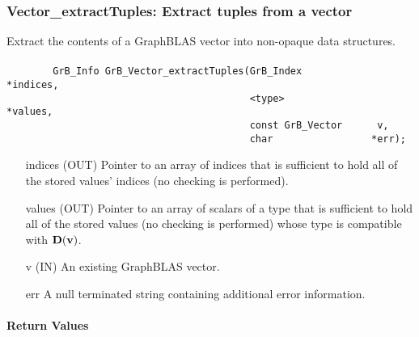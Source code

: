 
\subsubsection{{\sf Vector\_extractTuples}: Extract tuples from a vector}
\label{Sec:Vector_extractTuples}

Extract the contents of a GraphBLAS vector into non-opaque data structures.

\paragraph{\syntax}

\begin{verbatim}
        GrB_Info GrB_Vector_extractTuples(GrB_Index            *indices,
                                          <type>               *values, 
                                          const GrB_Vector      v,
                                          char                 *err);

\end{verbatim}

\begin{itemize}[leftmargin=1.1in]
    \item[{\sf indices}] ({\sf OUT}) Pointer to an array of indices that is sufficient to
                        hold all of the stored values' indices (no checking is performed).
    \item[{\sf values}] ({\sf OUT}) Pointer to an array of scalars of a type that is sufficient to
                        hold all of the stored values (no checking is performed) whose
                        type is compatible with $\bold{D}({\bf v})$.
    \item[{\sf v}]      ({\sf IN})  An existing GraphBLAS vector.
    \item[{\sf err}]     A null terminated string containing additional error information.
\end{itemize}

\paragraph{Return Values}

